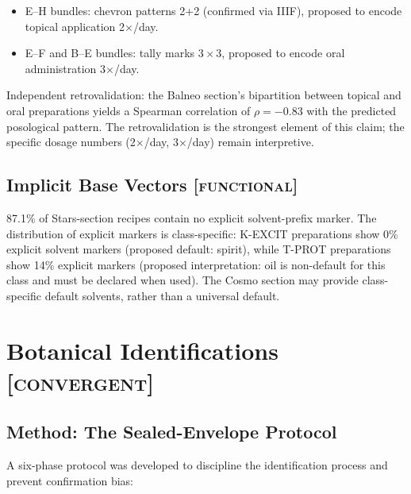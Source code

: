 \documentclass[11pt,a4paper]{article}
\newcommand{\functional}{\textsc{[functional]}}
\newcommand{\convergent}{\textsc{[convergent]}}
\begin{document}
\begin{itemize}[leftmargin=2em]
\item E--H bundles: chevron patterns 2+2 (confirmed via IIIF), proposed to encode topical application 2$\times$/day.
\item E--F and B--E bundles: tally marks $3 \times 3$, proposed to encode oral administration 3$\times$/day.
\end{itemize}

Independent retrovalidation: the Balneo section's bipartition between topical and oral preparations yields a Spearman correlation of $\rho = -0.83$ with the predicted posological pattern. The retrovalidation is the strongest element of this claim; the specific dosage numbers (2$\times$/day, 3$\times$/day) remain interpretive.

\subsection{Implicit Base Vectors \functional{}}

87.1\% of Stars-section recipes contain no explicit solvent-prefix marker. The distribution of explicit markers is class-specific: K-EXCIT preparations show 0\% explicit solvent markers (proposed default: spirit), while T-PROT preparations show 14\% explicit markers (proposed interpretation: oil is non-default for this class and must be declared when used). The Cosmo section may provide class-specific default solvents, rather than a universal default.

\section{Botanical Identifications \convergent{}}

\subsection{Method: The Sealed-Envelope Protocol}

A six-phase protocol was developed to discipline the identification process and prevent confirmation bias:
\end{document}
